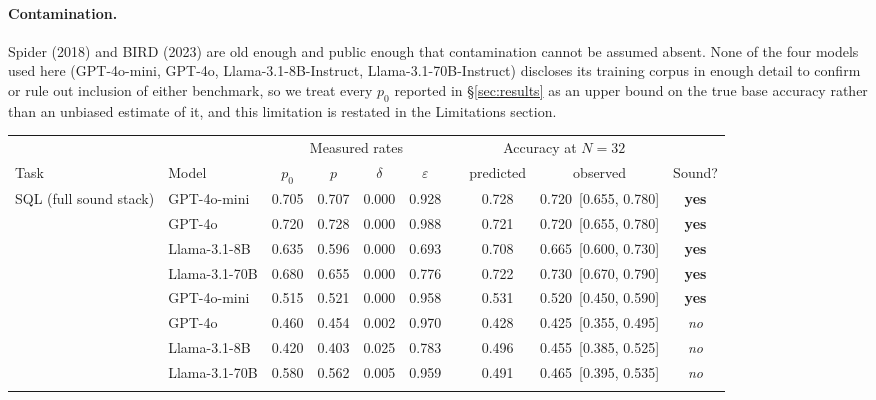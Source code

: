 \documentclass[11pt]{article}
\begin{document}
\paragraph{Contamination.} Spider (2018) and BIRD (2023) are old enough and public enough that contamination cannot be assumed absent. None of the four models used here (GPT-4o-mini, GPT-4o, Llama-3.1-8B-Instruct, Llama-3.1-70B-Instruct) discloses its training corpus in enough detail to confirm or rule out inclusion of either benchmark, so we treat every $p_0$ reported in \S\ref{sec:results} as an upper bound on the true base accuracy rather than an unbiased estimate of it, and this limitation is restated in the Limitations section.

\begin{table}[t]\centering\small
\begin{threeparttable}
\setlength{\tabcolsep}{5pt}
\begin{tabular}{@{}ll cccc c cc c@{}}
\toprule
& & \multicolumn{4}{c}{Measured rates} & & \multicolumn{2}{c}{Accuracy at $N{=}32$} & \\
\cmidrule(lr){3-6}\cmidrule(lr){8-9}
Task & Model & $p_0$ & $p$ & $\delta$\tnote{a} & $\varepsilon$\tnote{b} & &
  predicted\tnote{c} & observed\tnote{e} & Sound?\tnote{d} \\
\midrule
\multirow{4}{*}{SQL (full sound stack)}
  & GPT-4o-mini   & 0.705 & 0.707 & 0.000 & 0.928 & & 0.728 & 0.720~[0.655, 0.780] & \textbf{yes} \\
  & GPT-4o        & 0.720 & 0.728 & 0.000 & 0.988 & & 0.721 & 0.720~[0.655, 0.780] & \textbf{yes} \\
  & Llama-3.1-8B  & 0.635 & 0.596 & 0.000 & 0.693 & & 0.708 & 0.665~[0.600, 0.730] & \textbf{yes} \\
  & Llama-3.1-70B & 0.680 & 0.655 & 0.000 & 0.776 & & 0.722 & 0.730~[0.670, 0.790] & \textbf{yes} \\
\addlinespace
\multirow{4}{*}{IE (full sound stack)\tnote{g}}
  & GPT-4o-mini   & 0.515 & 0.521 & 0.000 & 0.958 & & 0.531 & 0.520~[0.450, 0.590] & \textbf{yes} \\
  & GPT-4o        & 0.460 & 0.454 & 0.002 & 0.970 & & 0.428 & 0.425~[0.355, 0.495] & \textit{no} \\
  & Llama-3.1-8B  & 0.420 & 0.403 & 0.025 & 0.783 & & 0.496 & 0.455~[0.385, 0.525] & \textit{no} \\
  & Llama-3.1-70B & 0.580 & 0.562 & 0.005 & 0.959 & & 0.491 & 0.465~[0.395, 0.535] & \textit{no} \\
\addlinespace
\multirow{4}{*}{Morph.\ (\texttt{concatenates})\tnote{h}}

\end{tabular}
\end{threeparttable}
\end{table}
\end{document}
